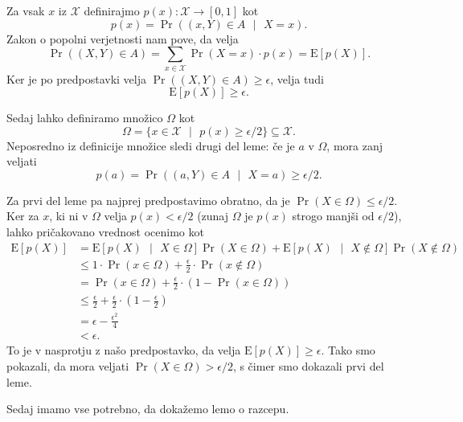 \begin{dokaz}
    Za vsak $x$ iz $\mathcal{X}$ definirajmo $p(x): \mathcal{X} \rightarrow [0, 1]$ kot
    $$
    p(x) = \Pr((x, Y) \in A \text{ }|\text{ } X = x).
    $$
    Zakon o popolni verjetnosti nam pove, da velja
    $$
    \Pr((X, Y) \in A) = \sum_{x \in \mathcal{X}} \Pr(X = x) \cdot p(x) = \text{E}[p(X)].
    $$
    Ker je po predpostavki velja $\Pr((X, Y) \in A) \geq \epsilon$, velja tudi
    $$
    \text{E}[p(X)] \geq \epsilon.
    $$

    Sedaj lahko definiramo množico $\Omega$ kot
    $$
    \Omega = \{x \in \mathcal{X} \text{ }|\text{ }p(x) \geq \epsilon / 2\} \subseteq \mathcal{X}.
    $$
    Neposredno iz definicije množice sledi drugi del leme: če je $a$ v $\Omega$, mora zanj veljati
    $$
    p(a) = \Pr((a, Y) \in A \text{ }|\text{ } X = a) \geq \epsilon / 2.
    $$

    Za prvi del leme pa najprej predpostavimo obratno, da je $\Pr(X \in \Omega) \leq \epsilon / 2$.
    Ker za $x$, ki ni v $\Omega$ velja $p(x) < \epsilon / 2$ (zunaj $\Omega$ je $p(x)$ strogo manjši
    od $\epsilon / 2$), lahko pričakovano vrednost ocenimo kot
    \begin{align*}
        \text{E}[p(X)] &= \text{E}[p(X) \text{ }|\text{ } X \in \Omega] \Pr(X \in \Omega) +
            \text{E}[p(X) \text{ }|\text{ } X \notin \Omega ] \Pr(X \notin \Omega) \\
                       &\leq 1 \cdot \Pr(x \in \Omega) + \frac{\epsilon}{2} \cdot \Pr(x \notin \Omega) \\
                       &= \Pr(x \in \Omega) + \frac{\epsilon}{2} \cdot (1 - \Pr(x \in \Omega)) \\
                       &\leq \frac{\epsilon}{2} + \frac{\epsilon}{2} \cdot \left(1 - \frac{\epsilon}{2}\right) \\
                       &= \epsilon - \frac{\epsilon^2}{4} \\
                       &< \epsilon.
    \end{align*}
    To je v nasprotju z našo predpostavko, da velja $\text{E}[p(X)] \geq \epsilon$. Tako smo pokazali,
    da mora veljati $\Pr(X \in \Omega) > \epsilon / 2$, s čimer smo dokazali prvi del leme.
\end{dokaz}

Sedaj imamo vse potrebno, da dokažemo lemo o razcepu.

